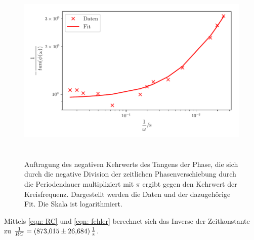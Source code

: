 \begin{figure}
  \centering
  \includegraphics[width=13cm, height=9cm]{build/plotc.pdf}
  \caption{Auftragung des negativen Kehrwerts des Tangens der Phase, die sich durch die negative Division der 
  zeitlichen Phasenverschiebung durch die Periodendauer multipliziert mit $\pi$ ergibt gegen den Kehrwert der 
  Kreisfrequenz. Dargestellt werden die Daten und der dazugehörige Fit. Die Skala ist logarithmiert.}
  \label{fig:plotc}
\end{figure}

\noindent Mittels \eqref{eqn: RC} und \eqref{eqn: fehler} berechnet sich das Inverse der Zeitkonstante zu
$\frac{1}{RC} = \SI[per-mode=fraction]{873.015 \pm 26.684}{\per\second}$.

